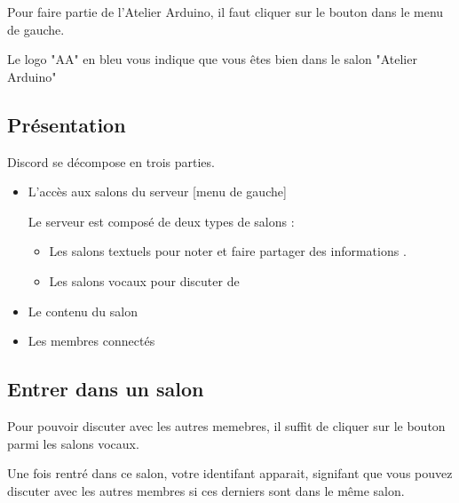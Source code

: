 Pour faire partie de l'Atelier Arduino, il faut cliquer sur le bouton  dans le menu de gauche. \\



Le logo "AA" en bleu vous indique que vous êtes bien dans le salon "Atelier Arduino"


\subsection{Présentation}

Discord se décompose en trois parties. 

\begin{itemize}
	\item L'accès aux salons du serveur [menu de gauche]


	Le serveur est composé de deux types de salons : 

	\begin{itemize}
		\item Les salons textuels pour noter et faire partager des informations .
		\item Les salons vocaux pour discuter de 
	\end{itemize}


	\item Le contenu du salon
	\item Les membres connectés
\end{itemize}



\subsection{Entrer dans un salon}

Pour pouvoir discuter avec les autres memebres, il suffit de cliquer sur le bouton  parmi les salons vocaux.


Une fois rentré dans ce salon, votre identifant apparait, signifant que vous pouvez discuter avec les autres membres si ces derniers sont dans le même salon.

